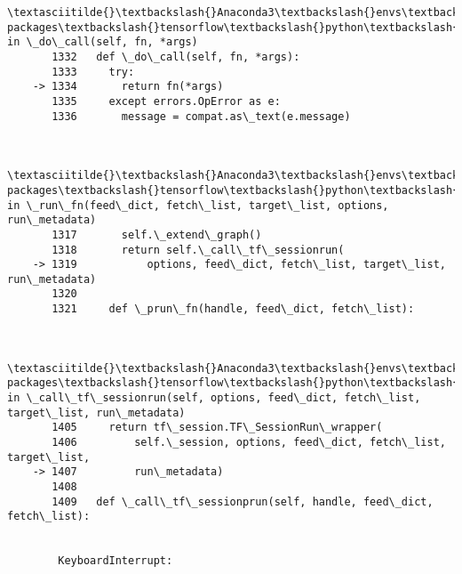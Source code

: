 \documentclass[11pt]{article}
\begin{document}
\begin{Verbatim}[commandchars=\\\{\}]
        \textasciitilde{}\textbackslash{}Anaconda3\textbackslash{}envs\textbackslash{}keras2\textbackslash{}lib\textbackslash{}site-packages\textbackslash{}tensorflow\textbackslash{}python\textbackslash{}client\textbackslash{}session.py in \_do\_call(self, fn, *args)
       1332   def \_do\_call(self, fn, *args):
       1333     try:
    -> 1334       return fn(*args)
       1335     except errors.OpError as e:
       1336       message = compat.as\_text(e.message)
    

        \textasciitilde{}\textbackslash{}Anaconda3\textbackslash{}envs\textbackslash{}keras2\textbackslash{}lib\textbackslash{}site-packages\textbackslash{}tensorflow\textbackslash{}python\textbackslash{}client\textbackslash{}session.py in \_run\_fn(feed\_dict, fetch\_list, target\_list, options, run\_metadata)
       1317       self.\_extend\_graph()
       1318       return self.\_call\_tf\_sessionrun(
    -> 1319           options, feed\_dict, fetch\_list, target\_list, run\_metadata)
       1320 
       1321     def \_prun\_fn(handle, feed\_dict, fetch\_list):
    

        \textasciitilde{}\textbackslash{}Anaconda3\textbackslash{}envs\textbackslash{}keras2\textbackslash{}lib\textbackslash{}site-packages\textbackslash{}tensorflow\textbackslash{}python\textbackslash{}client\textbackslash{}session.py in \_call\_tf\_sessionrun(self, options, feed\_dict, fetch\_list, target\_list, run\_metadata)
       1405     return tf\_session.TF\_SessionRun\_wrapper(
       1406         self.\_session, options, feed\_dict, fetch\_list, target\_list,
    -> 1407         run\_metadata)
       1408 
       1409   def \_call\_tf\_sessionprun(self, handle, feed\_dict, fetch\_list):
    

        KeyboardInterrupt: 

    \end{Verbatim}


    
    
    
    
\end{document}
